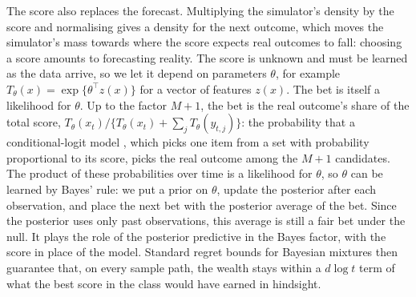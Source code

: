\documentclass[12pt]{article}
\theoremstyle{remark}
\begin{document}
The score also replaces the forecast. Multiplying the simulator's density by
the score and normalising gives a density for the next outcome, which moves
the simulator's mass towards where the score expects real outcomes to fall:
choosing a score amounts to forecasting reality. The score is unknown and must
be learned as the data arrive, so we let it depend on parameters $\theta$, for
example $T_\theta(x) = \exp\{\theta^\top z(x)\}$ for a vector of features
$z(x)$. The bet is itself a likelihood for $\theta$. Up to the factor $M+1$,
the bet is the real outcome's share of the total score,
$T_\theta(x_t)/\{T_\theta(x_t) + \sum_{j} T_\theta(y_{t,j})\}$: the
probability that a conditional-logit model \citep{mcfadden1974conditional},
which picks one item from a set
with probability proportional to its score, picks the real outcome among the
$M+1$ candidates. The product of these probabilities over time is a likelihood
for $\theta$, so $\theta$ can be learned by Bayes' rule: we put a prior on
$\theta$, update the posterior after each observation, and place the next bet
with the posterior average of the bet. Since the posterior uses only past
observations, this average is still a fair bet under the null. It plays the
role of the posterior predictive in the Bayes factor, with the score in place
of the model. Standard regret bounds for Bayesian mixtures
\citep{kakade2005online} then guarantee that, on every sample path, the wealth
stays within a $d\log t$ term of what the best score in the class would have
earned in hindsight.
\end{document}
